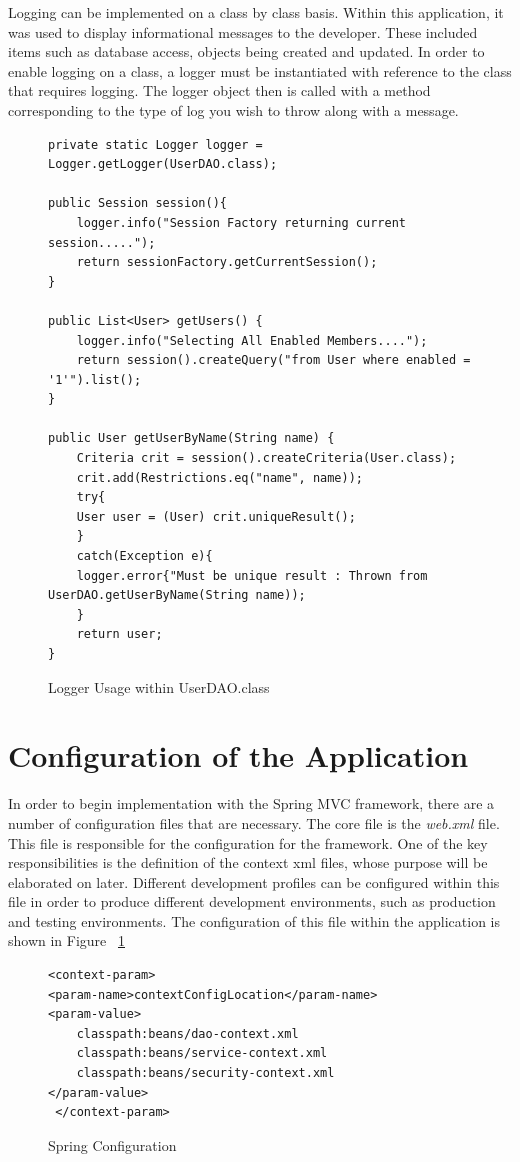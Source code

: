 Logging can be implemented on a class by class basis. Within this application, it was used to display informational messages to the developer. These included items such as database access, objects being created and updated. In order to enable logging on a class, a logger must be instantiated with reference to the class that requires logging. The logger object then is called with a method corresponding to the type of log you wish to throw along with a message.

\begin{figure}[H]
\begin{lstlisting}
private static Logger logger = Logger.getLogger(UserDAO.class);

public Session session(){ 
	logger.info("Session Factory returning current session.....");
	return sessionFactory.getCurrentSession();
}

public List<User> getUsers() {
	logger.info("Selecting All Enabled Members....");
	return session().createQuery("from User where enabled = '1'").list();
}

public User getUserByName(String name) {
	Criteria crit = session().createCriteria(User.class);
	crit.add(Restrictions.eq("name", name)); 
	try{
	User user = (User) crit.uniqueResult();
	}
	catch(Exception e){
	logger.error{"Must be unique result : Thrown from UserDAO.getUserByName(String name));
	}
	return user;
}
\end{lstlisting}
\caption{Logger Usage within UserDAO.class}
\end{figure}

\section{Configuration of the Application}

In order to begin implementation with the Spring MVC framework, there are a number of configuration files that are necessary. The core file is the \textit{web.xml} file. This file is responsible for the configuration for the framework. One of the key responsibilities is the definition of the context xml files, whose purpose will be elaborated on later. Different development profiles can be configured within this file in order to produce different development environments, such as production and testing environments. The configuration of this file within the application is shown in Figure ~\ref{fig:springConfig} \newline 
\begin{figure}[H]
\begin{lstlisting}
<context-param>
<param-name>contextConfigLocation</param-name>
<param-value>
	classpath:beans/dao-context.xml
	classpath:beans/service-context.xml
	classpath:beans/security-context.xml
</param-value>
 </context-param>
\end{lstlisting}
\caption{Spring Configuration}
\label{fig:springConfig}
\end{figure}

